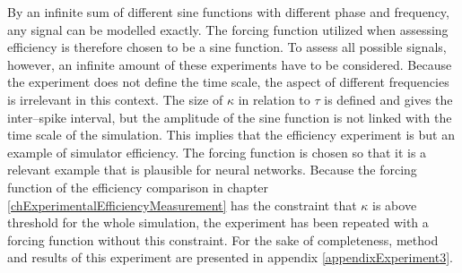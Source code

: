 	By an infinite sum of different sine functions with different phase and frequency, any signal can be modelled exactly\cite{CITE}.
	The forcing function utilized when assessing efficiency is therefore chosen to be a sine function.
	To assess all possible signals, however, an infinite amount of these experiments have to be considered.
	Because the experiment does not define the time scale, the aspect of different frequencies is irrelevant in this context.
	The size of $\kappa$ in relation to $\tau$ is defined and gives the inter--spike interval, but the amplitude of the sine function is not linked with the time scale of the simulation.
	This implies that the efficiency experiment is but an example of simulator efficiency.
	The forcing function is chosen so that it is a relevant example that is plausible for neural networks.
	Because the forcing function of the efficiency comparison in chapter \ref{chExperimentalEfficiencyMeasurement} has the constraint that $\kappa$ is above threshold for the whole simulation, the experiment has been repeated with a forcing function without this constraint.
	For the sake of completeness, method and results of this experiment are presented in appendix \ref{appendixExperiment3}.

